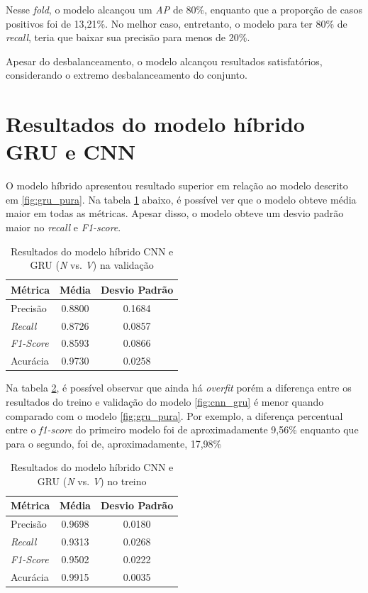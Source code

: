 \documentclass[
    12pt,                %
    openright,           %
    oneside,             %
    a4paper,             %
    brazil               %
]{abntex2}
\begin{document}
Nesse \textit{fold}, o modelo alcançou um \textit{AP} de 80\%, enquanto que a proporção de casos positivos foi de 13,21\%. No melhor caso, 
entretanto, o modelo para ter 80\% de \textit{recall}, teria que baixar sua precisão para menos de 20\%. 

Apesar do desbalanceamento, o modelo alcançou resultados satisfatórios, considerando o extremo desbalanceamento do conjunto.

\section{Resultados do modelo híbrido GRU e CNN}
\label{sec:resultados_gru_cnn}

O modelo híbrido apresentou resultado superior em relação ao modelo descrito em \ref{fig:gru_pura}. Na tabela \ref{tab:resultado_cv_gru_cnn_validacao}
abaixo, é possível ver que o modelo obteve média maior em todas as métricas. Apesar disso, o modelo obteve um desvio padrão maior 
no \textit{recall} e \textit{F1-score}. 

\begin{table}[H]
\centering
\caption{Resultados do modelo híbrido CNN e GRU (\textit{N} vs. \textit{V}) na validação}
\label{tab:resultado_cv_gru_cnn_validacao}
\begin{tabular}{lcc}
\hline
\textbf{Métrica} & \textbf{Média} & \textbf{Desvio Padrão} \\
\hline
Precisão & 0.8800 &  0.1684 \\
\textit{Recall} & 0.8726  & 0.0857 \\
\textit{F1-Score} & 0.8593 & 0.0866 \\
Acurácia & 0.9730 & 0.0258 \\
\hline
\end{tabular}
\end{table}

Na tabela  \ref{tab:resultado_cv_gru_cnn_treino}, é possível observar que ainda há \textit{overfit} porém a diferença entre os resultados
do treino e validação do modelo \ref{fig:cnn_gru} é menor quando comparado com o modelo \ref{fig:gru_pura}. Por exemplo, a 
diferença percentual entre o \textit{f1-score} do primeiro modelo foi de aproximadamente 9,56\% enquanto que para o segundo, foi de, aproximadamente, 17,98\%

\begin{table}[H]
\centering
\caption{Resultados do modelo híbrido CNN e GRU (\textit{N} vs. \textit{V}) no treino}
\label{tab:resultado_cv_gru_cnn_treino}
\begin{tabular}{lcc}
\hline
\textbf{Métrica} & \textbf{Média} & \textbf{Desvio Padrão} \\
\hline
Precisão & 0.9698 &  0.0180 \\
\textit{Recall} & 0.9313  & 0.0268 \\
\textit{F1-Score} & 0.9502 & 0.0222\\
Acurácia & 0.9915 & 0.0035 \\
\hline
\end{tabular}
\end{table}
\end{document}

